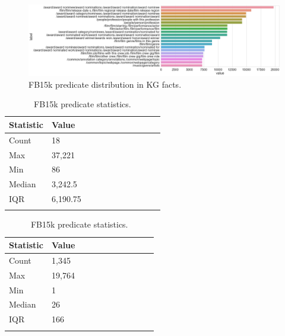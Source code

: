 \begin{figure}[H]
   	\centering
    	\includegraphics[width=1.0\textwidth, height=0.3\textheight]{FB15k_Predicate_Counts}
	\captionsetup{justification=centering}
	\caption{FB15k predicate distribution in KG facts.}
\end{figure}

\begin{table}[H]
	\parbox{.5\linewidth}{
		\centering
		\begin{tabular}{lllllllllll}
  			\textbf{Statistic} & \textbf{Value}  \\
  			\hline
			Count & 18 \\
			Max & 37,221  \\
			Min & 86 \\
  			Median & 3,242.5  \\
  			IQR & 6,190.75  \\
			&
		\end{tabular}
		\caption{WN18 predicate statistics.}
		}
	\hfill
	\parbox{.5\linewidth}{
		\centering
		\begin{tabular}{lllllllllll}
  			\textbf{Statistic} & \textbf{Value}  \\
  			\hline
			Count & 1,345 \\
			Max & 19,764  \\
			Min & 1  \\
  			Median & 26  \\
  			IQR & 166  \\
			&
		\end{tabular}
		\caption{FB15k predicate statistics.}
		}
\end{table}



